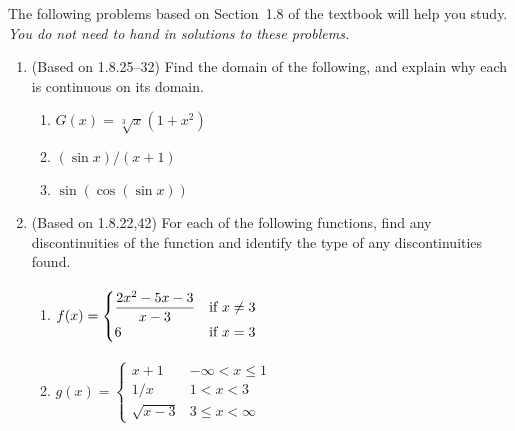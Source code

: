 \documentclass{article}
\title{\commonPSTitleZeroOneEight}
\author{\commonAuthor}
\date{\commonDateZeroOneEight}
\newcommand{\ds}{\displaystyle}
\begin{document}
\maketitle
\thispagestyle{empty}

\noindent
The following problems based on Section~1.8 of the textbook will help
you study.  \emph{You do not need to hand in solutions to these
  problems.}
\begin{enumerate} %
\item (Based on 1.8.25--32) %
  Find the domain of the following, and explain why each is continuous
  on its domain.
  \begin{multicols}{4}
  \begin{enumerate}
  \item $\ds G(x) = \sqrt[3]{x} (1+x^2)$
  \item $\ds (\sin x)/(x+1)$ %
  \item $\ds \sin(\cos(\sin x))$ %
  \end{enumerate}
  \end{multicols}
\item (Based on 1.8.22,42) %
  For each of the following functions, find any discontinuities of the
  function and identify the type of any discontinuities found.
  \begin{multicols}{2}
  \begin{enumerate}
  \item $\ds
      f(x) = \begin{cases} 
        \ds \frac{2x^2-5x-3}{x-3} &\mbox{if $x\ne 3$} \\
        6                         &\mbox{if $x=3$}
      \end{cases}
      \vphantom{\begin{cases} a \\ b \\ c \end{cases}}
    $
  \item $\ds
      g(x) = \begin{cases}
        x+1        & \mbox{$-\infty <   x \le 1     $} \\
        1/x        & \mbox{$1       <   x <   3     $} \\
        \sqrt{x-3} & \mbox{$3       \le x <   \infty$}
      \end{cases}
    $
  \end{enumerate}
  \end{multicols}

\end{enumerate}
\end{document}
